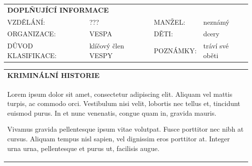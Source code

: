 \documentclass[a4paper, 11pt]{article}
\newlength{\fontheight}
\def\bottomrulewidth{0.3mm}		%
\def\tabtitleextraheight{5pt}	%
\def\tablestretch{1.4}			%
\newcommand{\blackcell}{\cellcolor{black} \color{white} \ttfamily \bfseries}
\newcommand{\TI}[4]{\ttfamily \MakeUppercase{#1}: & \ttfamily #2 & \ttfamily \MakeUppercase{#3}: & \ttfamily #4 \\ \midrule}
\newcommand{\LTI}[4]{\ttfamily \MakeUppercase{#1}: & \ttfamily #2 & \ttfamily \MakeUppercase{#3}: & \ttfamily #4 \\ \bottomrule[\bottomrulewidth]}
\newcommand{\tabtitle}[2]{\multicolumn{#1}{l}{\blackcell \MakeUppercase{#2}\rule{0pt}{\dimexpr \fontheight + 1pt + \tabtitleextraheight \relax} } \\ [\tabtitleextraheight]}
\begin{document}
	\vspace*{0.5cm}
	\begin{table}[H]
		\renewcommand\tabularxcolumn[1]{m{#1}}
		\def\arraystretch{\tablestretch}
		\begin{tabularx}{\textwidth}{l X l X}
			\tabtitle{4}{doplňující informace}
			\TI{vzdělání}{???}{manžel}{neznámý}
			\TI{organizace}{VESPA}{děti}{2 dcery}
			\LTI{důvod klasifikace}{klíčový člen VESPY}{poznámky}{tráví své oběti}
		\end{tabularx}
	\end{table}
	
	\begin{table}[H]
		\renewcommand\tabularxcolumn[1]{m{#1}}
		\def\arraystretch{\tablestretch}
		\begin{tabularx}{\textwidth}{X}
			\tabtitle{1}{kriminální historie}
			\ttfamily Lorem ipsum dolor sit amet, consectetur adipiscing elit. Aliquam vel mattis turpis, ac commodo orci. Vestibulum nisi velit, lobortis nec tellus et, tincidunt euismod purus. In et nunc venenatis, congue quam in, gravida mauris.
			
			Vivamus gravida pellentesque ipsum vitae volutpat. Fusce porttitor nec nibh at cursus. Aliquam tempus nisl sapien, vel dignissim eros porttitor at. Integer urna urna, pellentesque et purus ut, facilisis augue.  \\ \bottomrule[\bottomrulewidth]
		\end{tabularx}
	\end{table}
	
\end{document}
